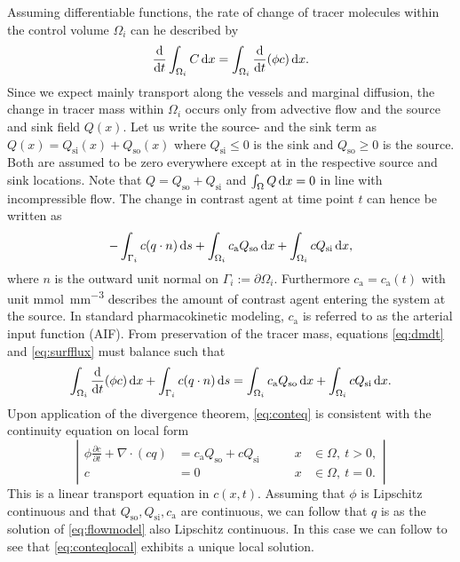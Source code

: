 \documentclass[paper=a4, fontsize=12pt,parskip=half, draft, headings=small]{scrartcl}
\newcommand{\Qso}{Q_{\mathrm{so}}}
\newcommand{\Qsi}{Q_{\mathrm{si}}}
\newcommand{\ca}{c_\mathrm{a}}
\newcommand{\sic}{\milli\mol\per\cubic\milli\meter}
\begin{document}
	Assuming differentiable functions, the rate of change of tracer molecules within the control volume $\Omega_i$ can he described by
	\begin{equation}
		\frac{\mathrm{d}}{\mathrm{d} t}\int_{\Omega_i}C \,\mathrm{d} x = \int_{\Omega_i}\frac{\mathrm{d}}{\mathrm{d} t}(\phi c) \,\mathrm{d} x.
		\label{eq:dmdt}
	\end{equation}	
	Since we expect mainly transport along the vessels and marginal diffusion, the change in tracer mass within $\Omega_i$ occurs only from advective flow and the source and sink field $Q(x)$.
	Let us write the source- and the sink term as $Q(x) = \Qsi(x) + \Qso(x)$ where $\Qsi \le 0$ is the sink and $\Qso \ge 0$ is the source. 
	Both are assumed to be zero everywhere except at in the respective source and sink locations.
	Note that $Q = \Qso + \Qsi$ and $\int_\Omega Q \,\mathrm{d} x =0$ in line with incompressible flow. 
	The change in contrast agent at time point $t$ can hence be written as
	\begin{equation}
		-\int_{ \Gamma_i}c(q \cdot n)\diffint s + \int_{\Omega_i}\ca \Qso \diffint x + \int_{\Omega_i}c\Qsi \diffint x,
		\label{eq:surfflux}
	\end{equation}
	where $n$ is the outward unit normal on $\Gamma_i := \partial \Omega_i$.
	Furthermore $\ca = \ca(t)$ with unit \si{\sic} describes the amount of contrast agent entering the system at the source. 
	In standard pharmacokinetic modeling, $\ca$ is referred to as the arterial input function (AIF).
	From preservation of the tracer mass, equations \eqref{eq:dmdt} and \eqref{eq:surfflux} must balance such that
	\begin{equation}
		\int_{\Omega_i}\diffop{t} (\phi c) \diffint x + \int_{ \Gamma_i}c(q \cdot n) \diffint s = \int_{\Omega_i}\ca\Qso \diffint x + \int_{\Omega_i}c \Qsi \diffint x.
		\label{eq:conteq}
	\end{equation}
	Upon application of the divergence theorem, \eqref{eq:conteq} is consistent with the continuity equation on local form
	\begin{equation}
		\left\vert
		\begin{alignedat}{2}
			\phi \frac{\partial c}{\partial t} + \nabla \cdot (cq) &= \ca\Qso + c\Qsi \qquad	&x &\in \Omega, \ t>0,  \\
			c &= 0 																			 	&x &\in \Omega, \ t=0.
		\end{alignedat}
		\right\vert
		\label{eq:conteqlocal}
	\end{equation}
	This is a linear transport equation in $c(x,t)$. 
	Assuming that $\phi$ is Lipschitz continuous and that $\Qso,\Qsi,\ca$ are continuous, we can follow that $q$ is as the solution of \eqref{eq:flowmodel} also Lipschitz continuous.
	In this case we can follow \cite{evans98} to see that \eqref{eq:conteqlocal} exhibits a unique local solution.
	
\end{document}

